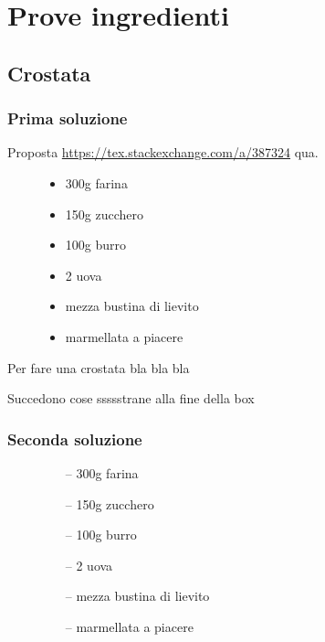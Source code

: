 \documentclass[a4paper,11pt]{book}
\newlength{\strutheight}
\begin{document}
\chapter{Prove ingredienti}

\section{Crostata}

\subsection{Prima soluzione}

Proposta \url{https://tex.stackexchange.com/a/387324} qua.

\begin{adjustbox}{valign=T,raise=\strutheight,minipage={1.0\linewidth}}
    \begin{wrapfigure}{c}{0.55\linewidth}
        \begin{itemize}
            \item 300g farina
            \item 150g zucchero
            \item 100g burro
            \item 2 uova
            \item mezza bustina di lievito
            \item marmellata a piacere
        \end{itemize}
    \end{wrapfigure}%
%
\lipsum[1]
\end{adjustbox}  

Per fare una crostata bla bla bla
\lipsum[2]

Succedono cose ssssstrane alla fine della box
 
\subsection{Seconda soluzione}

\begin{wrapfigure}{c}{0.55\linewidth}
    \begin{itemize}
        \item[--] 300g farina
        \item[--] 150g zucchero
        \item[--] 100g burro
        \item[--] 2 uova
        \item[--] mezza bustina di lievito
        \item[--] marmellata a piacere
    \end{itemize}
\end{wrapfigure}%
\end{document}
